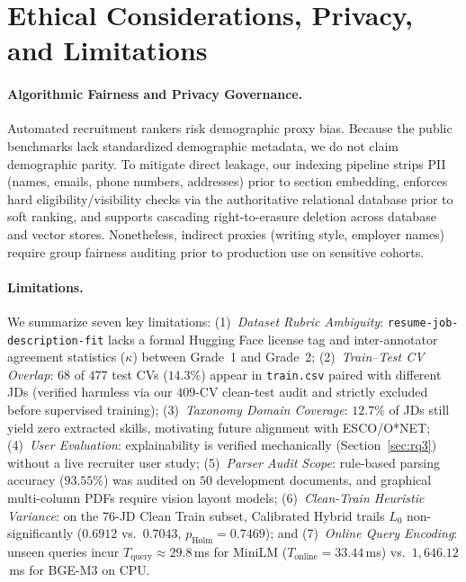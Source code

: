 \section{Ethical Considerations, Privacy, and Limitations}

\paragraph{Algorithmic Fairness and Privacy Governance.}
Automated recruitment rankers risk demographic proxy bias. Because the public benchmarks lack standardized demographic metadata, we do not claim demographic parity. To mitigate direct leakage, our indexing pipeline strips PII (names, emails, phone numbers, addresses) prior to section embedding, enforces hard eligibility/visibility checks via the authoritative relational database prior to soft ranking, and supports cascading right-to-erasure deletion across database and vector stores. Nonetheless, indirect proxies (writing style, employer names) require group fairness auditing prior to production use on sensitive cohorts.

\paragraph{Limitations.}
We summarize seven key limitations:
(1)~\textit{Dataset Rubric Ambiguity}: \texttt{resume-job-description-fit} lacks a formal Hugging Face license tag and inter-annotator agreement statistics ($\kappa$) between Grade~1 and Grade~2;
(2)~\textit{Train--Test CV Overlap}: $68$ of $477$ test CVs ($14.3\%$) appear in \texttt{train.csv} paired with different JDs (verified harmless via our $409$-CV clean-test audit and strictly excluded before supervised training);
(3)~\textit{Taxonomy Domain Coverage}: $12.7\%$ of JDs still yield zero extracted skills, motivating future alignment with ESCO/O*NET;
(4)~\textit{User Evaluation}: explainability is verified mechanically (Section~\ref{sec:rq3}) without a live recruiter user study;
(5)~\textit{Parser Audit Scope}: rule-based parsing accuracy ($93.55\%$) was audited on $50$ development documents, and graphical multi-column PDFs require vision layout models;
(6)~\textit{Clean-Train Heuristic Variance}: on the $76$-JD Clean Train subset, Calibrated Hybrid trails $L_0$ non-significantly ($0.6912$ vs.\ $0.7043$, $p_{\text{Holm}}=0.7469$); and
(7)~\textit{Online Query Encoding}: unseen queries incur $T_{\text{query}} \approx 29.8$\,ms for MiniLM ($T_{\text{online}}=33.44$\,ms) vs.\ $1{,}646.12$\,ms for BGE-M3 on CPU.
